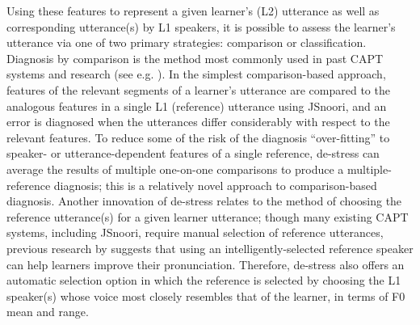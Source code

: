 \documentclass[11pt,a4paper,onecolumn]{article}
\newcommand{\TODO}[1]{{\color{red}\textbf{[TODO #1]}}}
\begin{document}
	
	Using these features to represent a given learner's (L2) utterance as well as corresponding utterance(s) by L1 speakers, it is possible to assess the learner's utterance via one of two primary strategies: comparison or classification. 
	Diagnosis by comparison is the method most commonly used in past CAPT systems and research (see e.g. \cite{Eskenazi2009,Bonneau2011,Delmonte2011}).
	In the simplest comparison-based approach, features of the relevant segments of a learner's utterance are compared to the analogous features in a single L1 (reference) utterance using JSnoori, and an error is diagnosed when the utterances differ considerably with respect to the relevant features. 
	To reduce some of the risk of the diagnosis ``over-fitting'' to speaker- or utterance-dependent features of a single reference, de-stress can average the results of multiple one-on-one comparisons to produce a multiple-reference diagnosis; this is a relatively novel approach to comparison-based diagnosis.
	Another innovation of de-stress relates to the method of choosing the reference utterance(s) for a given learner utterance; though many existing CAPT systems, including JSnoori, require manual selection of reference utterances, previous research by \textcite{Probst2002} suggests that using an intelligently-selected reference speaker can help learners improve their pronunciation. Therefore, de-stress also offers an automatic selection option in which the reference is selected by choosing the L1 speaker(s) whose voice most closely resembles that of the learner, in terms of F0 mean and range.
	
\end{document}
